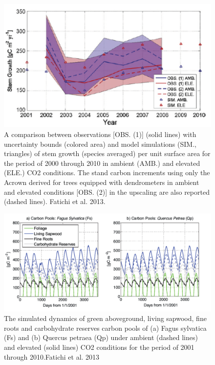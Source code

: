 \documentclass[
  12pt,
  oneside]{book}
\begin{document}
\begin{figure}

{\centering \includegraphics[width=0.8\linewidth]{figures/chap5/f512_fatichi_growth} 

}

\caption{A comparison between observations [OBS. (1)] (solid lines) with uncertainty bounds (colored area) and model simulations (SIM., triangles) of stem growth (species averaged) per unit surface area for the period of 2000 through 2010 in ambient (AMB.) and elevated (ELE.) CO2 conditions. The stand carbon increments using only the Acrown derived for trees equipped with dendrometers in ambient and elevated conditions [OBS. (2)] in the upscaling are also reported (dashed lines). Fatichi et al. 2013.}\label{fig:f512}
\end{figure}

\begin{figure}

{\centering \includegraphics[width=0.8\linewidth]{figures/chap5/f513_fatichi_pools} 

}

\caption{The simulated dynamics of green aboveground, living sapwood, fine roots and carbohydrate reserves carbon pools of (a) Fagus sylvatica (Fs) and (b) Quercus petraea (Qp) under ambient (dashed lines) and elevated (solid lines) CO2 conditions for the period of 2001 through 2010.Fatichi et al. 2013}\label{fig:f513}
\end{figure}
\end{document}
